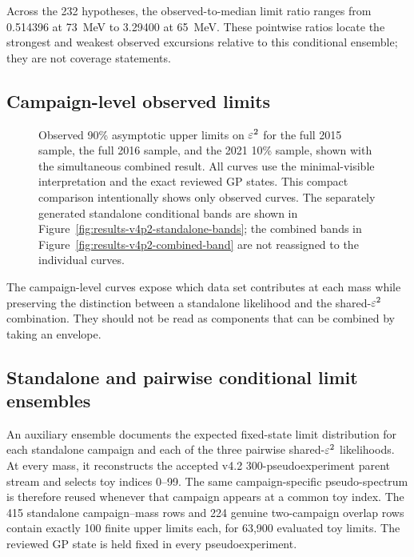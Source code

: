 Across the 232 hypotheses, the observed-to-median limit ratio ranges from
0.514396 at 73~MeV to 3.29400 at 65~MeV. These pointwise ratios locate the
strongest and weakest observed excursions relative to this conditional ensemble;
they are not coverage statements.

\subsection{Campaign-level observed limits}
\label{sec:results-v4p2-individual-limits}

\begin{figure}[H]
\centering
{}
\caption{Observed 90\% asymptotic \CLs{} upper limits on $\varepsilon^2$ for the full
2015 sample, the full 2016 sample, and the 2021 10\% sample, shown with the
simultaneous combined result. All curves use the minimal-visible interpretation
and the exact reviewed GP states. This compact comparison intentionally shows
only observed curves. The separately generated standalone conditional bands
are shown in Figure~\ref{fig:results-v4p2-standalone-bands}; the combined bands
in Figure~\ref{fig:results-v4p2-combined-band} are not reassigned to the
individual curves.}
\label{fig:results-v4p2-individual-limits}
\end{figure}

The campaign-level curves expose which data set contributes at each mass while
preserving the distinction between a standalone likelihood and the shared-$\varepsilon^2$
combination. They should not be read as components that can be combined by taking
an envelope.

\subsection{Standalone and pairwise conditional limit ensembles}
\label{sec:results-v4p2-standalone-pairwise-bands}

An auxiliary ensemble documents the expected fixed-state limit distribution for
each standalone campaign and each of the three pairwise shared-$\varepsilon^2$
likelihoods. At every mass, it reconstructs the accepted v4.2
300-pseudoexperiment parent stream and selects toy indices 0--99. The same
campaign-specific pseudo-spectrum is therefore reused whenever that campaign
appears at a common toy index. The 415 standalone campaign--mass rows and 224
genuine two-campaign overlap rows contain exactly 100 finite upper limits each,
for 63,900 evaluated toy limits. The reviewed GP state is held fixed in every
pseudoexperiment.

